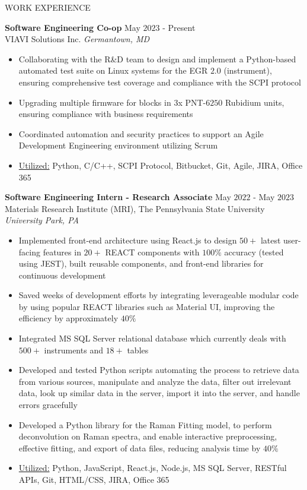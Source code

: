 \documentclass{resume} %
\begin{document}
\begin{rSection}{WORK EXPERIENCE}

\textbf{Software Engineering Co-op} \hfill May $2023$ - Present\\
VIAVI Solutions Inc. \hfill \textit{Germantown, MD}
 \begin{itemize}[itemsep = -4pt]
     \item Collaborating with the R\&D team to design and implement a Python-based automated test suite on Linux systems for the EGR $2.0$ (instrument), ensuring comprehensive test coverage and compliance with the SCPI protocol
     \item Upgrading multiple firmware for blocks in $3$x PNT-$6250$ Rubidium units, ensuring compliance with business requirements
     \item Coordinated automation and security practices to support an Agile Development Engineering environment utilizing Scrum
     \item \underline{Utilized:} Python, C/C++, SCPI Protocol, Bitbucket, Git, Agile, JIRA, Office 365
    \end{itemize}

\textbf{Software Engineering Intern - Research Associate} \hfill May $2022$ - May $2023$\\
Materials Research Institute (MRI), The Pennsylvania State University \hfill \textit{University Park, PA}
 \begin{itemize}[itemsep = -4pt]
     \item Implemented front-end architecture using React.js to design $50+$ latest user-facing features in $20+$ REACT components with $100\%$ accuracy (tested using JEST), built reusable components, and front-end libraries for continuous development
     \item Saved weeks of development efforts by integrating leverageable modular code by using popular REACT libraries such as Material UI, improving the efficiency by approximately $40\%$
     \item Integrated MS SQL Server relational database which currently deals with $500+$ instruments and $18+$ tables
     \item Developed and tested Python scripts automating the process to retrieve data from various sources, manipulate and analyze the data, filter out irrelevant data, look up similar data in the server, import it into the server, and handle errors gracefully
     \item Developed a Python library for the Raman Fitting model, to perform deconvolution on Raman spectra, and enable interactive preprocessing, effective fitting, and export of data files, reducing analysis time by $40\%$
     \item \underline{Utilized:} Python, JavaScript, React.js, Node.js, MS SQL Server, RESTful APIs, Git, HTML/CSS, JIRA, Office 365
    \end{itemize}

\end{rSection} 
\end{document}
